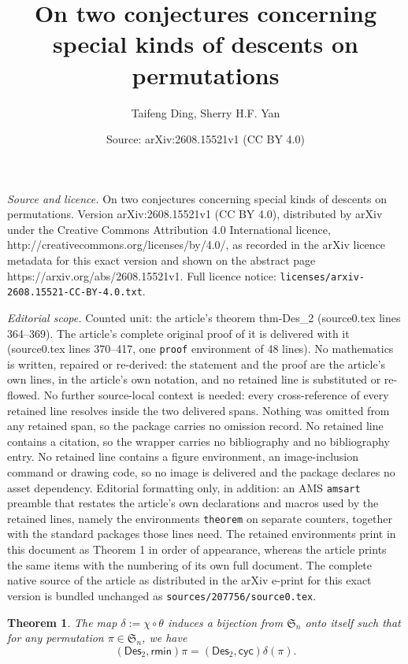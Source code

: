 \documentclass[10pt,a4paper]{amsart}
\title{On two conjectures concerning special kinds of descents on permutations}
\author{Taifeng Ding, Sherry H.F. Yan}
\date{Source: arXiv:2608.15521v1 (CC BY 4.0)}
\newtheorem{theorem}{Theorem}
\def\Des{\mathsf{Des}}
\def\cyc{\mathsf{cyc}}
\def\rmin{\mathsf{rmin}}
\begin{document}
\maketitle

\noindent\emph{Source and licence.} On two conjectures concerning special kinds of descents on permutations. Version arXiv:2608.15521v1 (CC BY 4.0), distributed by arXiv under the Creative Commons Attribution 4.0 International licence, http://creativecommons.org/licenses/by/4.0/, as recorded in the arXiv licence metadata for this exact version and shown on the abstract page https://arxiv.org/abs/2608.15521v1. Full licence notice: \texttt{licenses/arxiv-2608.15521-CC-BY-4.0.txt}.\par\smallskip

\noindent\textit{Editorial scope.} Counted unit: the article's theorem thm-Des\_2 (source0.tex lines 364--369). The article's complete original proof of it is delivered with it (source0.tex lines 370--417, one \texttt{proof} environment of 48 lines). No mathematics is written, repaired or re-derived: the statement and the proof are the article's own lines, in the article's own notation, and no retained line is substituted or re-flowed.  No further source-local context is needed: every cross-reference of every retained line resolves inside the two delivered spans.  Nothing was omitted from any retained span, so the package carries no omission record.  No retained line contains a citation, so the wrapper carries no bibliography and no bibliography entry.  No retained line contains a figure environment, an image-inclusion command or drawing code, so no image is delivered and the package declares no asset dependency.  Editorial formatting only, in addition: an AMS \texttt{amsart} preamble that restates the article's own declarations and macros used by the retained lines, namely the environments \texttt{theorem} on separate counters, together with the standard packages those lines need.  The retained environments print in this document as Theorem 1 in order of appearance, whereas the article prints the same items with the numbering of its own full document.  The complete native source of the article as distributed in the arXiv e-print for this exact version is bundled unchanged as \texttt{sources/207756/source0.tex}.
     \begin{theorem}\label{thm-Des_2}
     The map $\delta:=\chi\circ\theta$ induces a bijection from $\mathfrak{S}_n$ onto itself such that for any permutation $\pi\in \mathfrak{S}_n$, we have
     	\begin{equation}\label{eq-Des_2}
     	(\Des_2, \rmin)\pi= (\Des_2, \cyc)\delta(\pi).
     		\end{equation}
     	\end{theorem}
\end{document}
